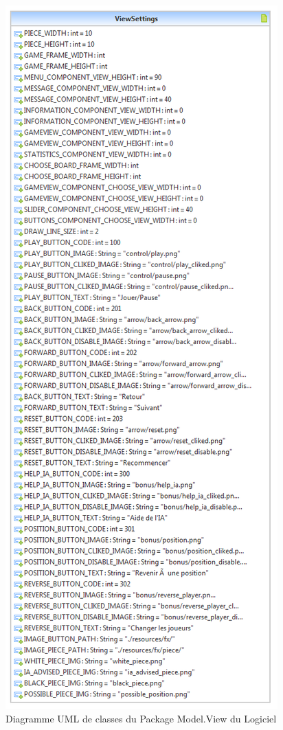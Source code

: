 \documentclass[a4paper,12pt]{report}
\begin{document}
\label{OthKerModelView}
\begin{figure}[H]
\centering
 \includegraphics[scale=0.65]{Kernel/Pack_com_model_view.png}
\caption{Diagramme UML de classes du Package Model.View du Logiciel}
\end{figure}
\end{document}
